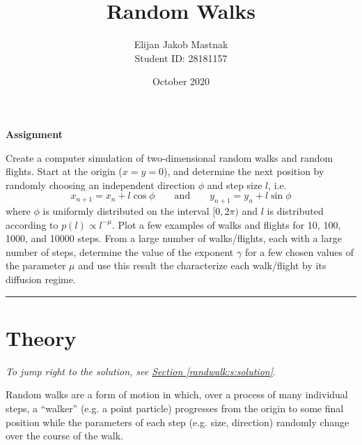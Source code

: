 \documentclass[11pt, a4paper]{article}
\newcommand{\eqtext}[1]{\qquad \text{#1} \qquad}
\begin{document}
\title{Random Walks}
\author{Elijan Jakob Mastnak\\[1mm]\small{Student ID: 28181157}}
\date{October 2020}
\maketitle

\tableofcontents


\newpage


\begin{center}
\textbf{Assignment}
\end{center}
Create a computer simulation of two-dimensional random walks and random flights. Start at the origin ($ x = y = 0 $), and determine the next position by randomly choosing an independent direction $ \phi $ and step size $ l $, i.e.
\begin{equation*}
	x_{n+1} = x_{n} + l \cos \phi \eqtext{and} y_{n+1} = y_{n} + l \sin \phi
\end{equation*}
where $ \phi $ is uniformly distributed on the interval $ [0, 2\pi) $ and $ l $ is distributed according to $ p(l) \propto l^{-\mu} $. Plot a few examples of walks and flights for 10, 100, 1000, and 10000 steps. From a large number of walks/flights, each with a large number of steps, determine the value of the exponent $ \gamma $ for a few chosen values of the parameter $ \mu $ and use this result the characterize each walk/flight by its diffusion regime.


\rule{\textwidth}{0.2pt}


\section{Theory}
\vspace{-2mm}
\textit{To jump right to the solution, see \hyperref[randwalk:s:solution]{Section \ref{randwalk:s:solution}}}.
\vspace{3mm}

Random walks are a form of motion in which, over a process of many individual steps, a ``walker'' (e.g. a point particle) progresses from the origin to some final position while the parameters of each step (e.g. size, direction) randomly change over the course of the walk. 
\end{document}
